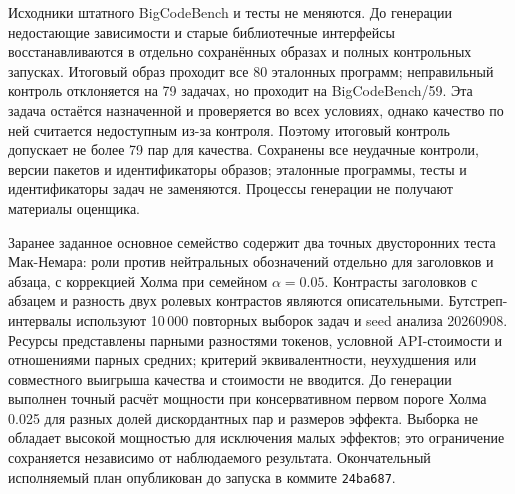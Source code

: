 Исходники штатного BigCodeBench и тесты не меняются. До генерации недостающие зависимости и старые библиотечные интерфейсы восстанавливаются в отдельно сохранённых образах и полных контрольных запусках. Итоговый образ проходит все 80 эталонных программ; неправильный контроль отклоняется на 79 задачах, но проходит на BigCodeBench/59. Эта задача остаётся назначенной и проверяется во всех условиях, однако качество по ней считается недоступным из-за контроля. Поэтому итоговый контроль допускает не более 79 пар для качества. Сохранены все неудачные контроли, версии пакетов и идентификаторы образов; эталонные программы, тесты и идентификаторы задач не заменяются. Процессы генерации не получают материалы оценщика.

Заранее заданное основное семейство содержит два точных двусторонних теста Мак-Немара: роли против нейтральных обозначений отдельно для заголовков и абзаца, с коррекцией Холма при семейном $\alpha=0.05$. Контрасты заголовков с абзацем и разность двух ролевых контрастов являются описательными. Бутстреп-интервалы используют 10\,000 повторных выборок задач и seed анализа 20260908. Ресурсы представлены парными разностями токенов, условной API-стоимости и отношениями парных средних; критерий эквивалентности, неухудшения или совместного выигрыша качества и стоимости не вводится. До генерации выполнен точный расчёт мощности при консервативном первом пороге Холма 0.025 для разных долей дискордантных пар и размеров эффекта. Выборка не обладает высокой мощностью для исключения малых эффектов; это ограничение сохраняется независимо от наблюдаемого результата. Окончательный исполняемый план опубликован до запуска в коммите \texttt{24ba687}.
